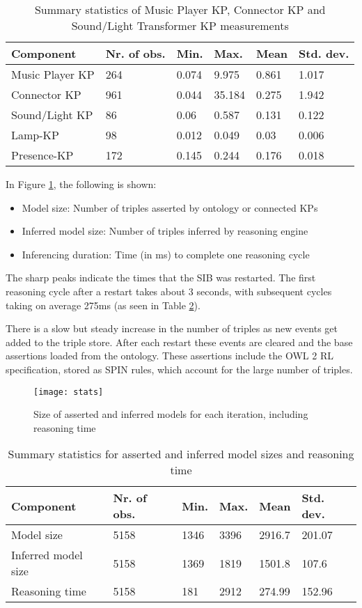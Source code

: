 \begin{table}[!t]
\caption{Summary statistics of Music Player KP, Connector KP and Sound/Light Transformer KP measurements}
\label{summaryKP}
\centering
\begin{tabular}{|l|l|l|l|l|l|}
\hline
Component &	 Nr. of obs. & Min. & Max. & Mean &	Std. dev.\\
\hline
Music Player KP & 264 & 0.074 & 9.975 & 0.861 & 1.017\\
Connector KP & 961 & 0.044 & 35.184 & 0.275 & 1.942\\
Sound/Light KP  & 86 & 0.06 & 0.587 & 0.131 & 0.122 \\
Lamp-KP & 98 & 0.012 & 0.049 & 0.03 &0.006 \\
Presence-KP & 172 & 0.145 & 0.244 & 0.176 & 0.018 \\
\hline
\end{tabular}
\end{table}

In Figure \ref{stats}, the following is shown:
\begin{itemize}
\item Model size: Number of triples asserted by ontology or connected KPs
\item Inferred model size: Number of triples inferred by reasoning engine
\item Inferencing duration: Time (in ms) to complete one reasoning cycle
\end{itemize}

The sharp peaks indicate the times that the SIB was restarted. The first reasoning cycle after a restart takes about 3 seconds,  with subsequent cycles taking on average 275ms (as seen in Table \ref{summarySIB}).

There is a slow but steady increase in the number of triples as new events get added to the triple store. After each restart these events are cleared and the base assertions loaded from the ontology. These assertions include the OWL 2 RL specification, stored as SPIN rules, which account for the large number of triples.

\begin{figure}
\centering
\texttt{[image: stats]}
\caption{Size of asserted and inferred models for each iteration, including reasoning time}
\label{stats}
\end{figure}

\begin{table}[!t]
\caption{Summary statistics for asserted and inferred model sizes and reasoning time}
\label{summarySIB}
\centering
\begin{tabular}{|l|l|l|l|l|l|}
\hline
Component &	 Nr. of obs. & Min. & Max. & Mean &	Std. dev.\\
\hline
Model size	& 5158 & 1346 &	3396 &	2916.7 & 201.07 \\
Inferred model size &	5158 &	1369 &	1819 &	1501.8 & 107.6 \\
Reasoning time & 5158 &	181 & 2912 & 274.99 & 152.96 \\
\hline
\end{tabular}
\end{table}

